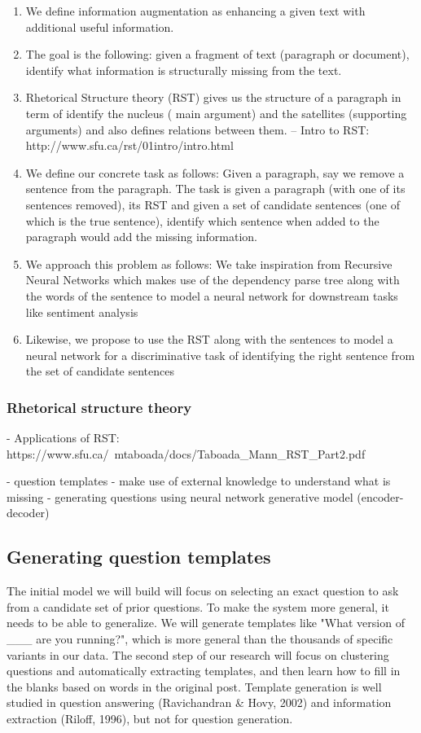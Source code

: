 \documentclass[11pt]{article}
\begin{document}
\begin{enumerate}
\item We define information augmentation as enhancing a given text with additional useful information. 
\item The goal is the following: given a fragment of text (paragraph or document), identify what information is structurally missing from the text. 
\item Rhetorical Structure theory (RST) gives us the structure of a paragraph in term of identify the nucleus ( main argument) and the satellites (supporting arguments) and also defines relations between them. -- Intro to RST: http://www.sfu.ca/rst/01intro/intro.html
\item We define our concrete task as follows: Given a paragraph, say we remove a sentence from the paragraph. The task is given a paragraph (with one of its sentences removed), its RST and given a set of candidate sentences (one of which is the true sentence), identify which sentence when added to the paragraph would add the missing information.
\item We approach this problem as follows: We take inspiration from Recursive Neural Networks which makes use of the dependency parse tree along with the words of the sentence to model a neural network for downstream tasks like sentiment analysis
\item Likewise, we propose to use the RST along with the sentences to model a neural network for a discriminative task of identifying the right sentence from the set of candidate sentences
\end{enumerate}

\subsubsection{Rhetorical structure theory}

- Applications of RST: https://www.sfu.ca/~mtaboada/docs/Taboada_Mann_RST_Part2.pdf

\iffalse
- question templates
- make use of external knowledge to understand what is missing
- generating questions using neural network generative model (encoder-decoder)

\subsection{Generating question templates}

The initial model we will build will focus on selecting an exact question to ask from a candidate set of prior questions. To make the system more general, it needs to be able to generalize. We will generate templates like "What version of \_\_\_ are you running?", which is more general than the thousands of specific variants in our data. The second step of our research will focus on clustering questions and automatically extracting templates, and then learn how to fill in the blanks based on words in the original post. Template generation is well studied in question answering (Ravichandran \& Hovy, 2002) and information extraction (Riloff, 1996), but not for question generation.
\end{document}
